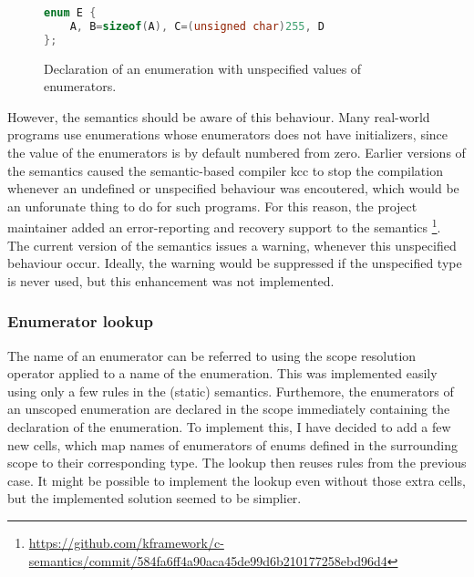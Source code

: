 \documentclass{fithesis3}
\begin{document}
\begin{figure}[h]
\begin{lstlisting}[language=C++]
enum E {
	A, B=sizeof(A), C=(unsigned char)255, D
};
\end{lstlisting}
\caption{Declaration of an enumeration with unspecified values of enumerators.}
\label{fig:ugly-enum}
\end{figure}

However, the semantics should be aware of this behaviour. Many real-world programs use enumerations whose enumerators does not have initializers, since the value of the enumerators is by default numbered from zero. Earlier versions of the semantics caused the semantic-based compiler kcc to stop the compilation whenever an undefined or unspecified behaviour was encoutered, which would be an unforunate thing to do for such programs. For this reason, the project maintainer added an error-reporting and recovery support to the semantics \footnote{\url{https://github.com/kframework/c-semantics/commit/584fa6ff4a90aca45de99d6b210177258ebd96d4}}. The current version of the semantics issues a warning, whenever this unspecified behaviour occur. Ideally, the warning would be suppressed if the unspecified type is never used, but this enhancement was not implemented.



\subsubsection{Enumerator lookup}

The name of an enumerator can be referred to using the scope resolution operator applied to a name of the enumeration. This was implemented easily using only a few rules in the (static) semantics.
Furthemore, the enumerators of an unscoped enumeration are declared in the scope immediately containing the declaration of the enumeration. To implement this, I have decided to add a few new cells, which map names of enumerators of enums defined in the surrounding scope to their corresponding type. The lookup then reuses rules from the previous case. It might be possible to implement the lookup even without those extra cells, but the implemented solution seemed to be simplier.
\end{document}
